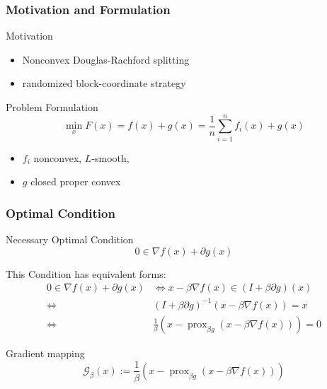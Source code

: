 
\begin{frame}
\frametitle{Motivation and Formulation}

\begin{block}{Motivation}
\begin{itemize}
    \item Nonconvex Douglas-Rachford splitting
    \item randomized block-coordinate strategy
\end{itemize}
\end{block}

\begin{block}{Problem Formulation}
\ 
\vspace{-1.3em}
$$\min_x F(x) = f(x) + g(x) = \frac{1}{n} \sum_{i=1}^n f_i(x) + g(x)$$
\vspace{-1.3em}
\begin{itemize}
    \item $f_i$ nonconvex, $L$-smooth,
    \item $g$ closed proper convex
\end{itemize}
\end{block}


\end{frame}


\begin{frame}
\frametitle{Optimal Condition}

\begin{block}{Necessary Optimal Condition}
\ 
\vspace{-1.3em}
$$0 \in \nabla f(x) + \partial g(x)$$
\end{block}

This Condition has equivalent forms:
\begin{align*}
    0 \in \nabla f(x) + \partial g(x) & \Longleftrightarrow x - \beta \nabla f(x) \in (I + \beta \partial g) (x) \\
    \Longleftrightarrow & (I + \beta \partial g)^{-1}(x - \beta \nabla f(x)) = x \\
    \Longleftrightarrow & \frac{1}{\beta} (x - \operatorname{prox}_{\beta g}(x - \beta \nabla f(x))) = 0
\end{align*}

\begin{block}{Gradient mapping}
\ 
\vspace{-1.3em}
$$\mathcal{G}_{\beta}(x) := \frac{1}{\beta} (x - \operatorname{prox}_{\beta g}(x - \beta \nabla f(x)))$$
\end{block}

\end{frame}

